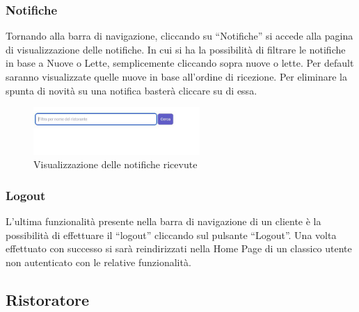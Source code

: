 \subsubsection{Notifiche}
Tornando alla barra di navigazione, cliccando su ``Notifiche'' si accede alla pagina di visualizzazione delle notifiche.
In cui si ha la possibilità di filtrare le notifiche in base a Nuove o Lette, semplicemente cliccando sopra nuove o lette. Per default 
saranno visualizzate quelle nuove in base all'ordine di ricezione. 
Per eliminare la spunta di novità su una notifica basterà cliccare su di essa.

\begin{figure}[htbp]
    \centering
    \includegraphics[width=0.5625\textwidth]{./img/Dettaglio.jpg}
    \caption{Visualizzazione delle notifiche ricevute}
\end{figure}

\subsubsection{Logout}
L'ultima funzionalità presente nella barra di navigazione di un cliente è la possibilità di effettuare il ``logout'' cliccando sul pulsante ``Logout''.
Una volta effettuato con successo si sarà reindirizzati nella Home Page di un classico utente non autenticato con le relative funzionalità.























\subsection{Ristoratore} %

